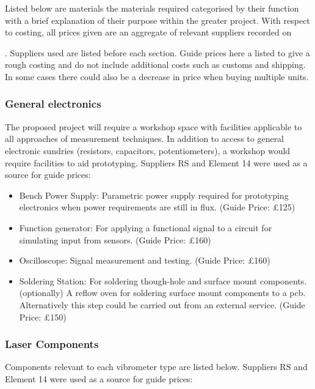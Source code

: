 Listed below are materials the materials required categorised by their function
with a brief explanation of their purpose within the greater project. With
respect to costing, all prices given are an aggregate of relevant
suppliers recorded on \date{\today}. Suppliers used are listed before each
section. Guide prices here a listed to give a rough costing and do not include
additional costs such as customs and shipping. In some cases there could also be
a decrease in price when buying multiple units.

\hypertarget{general-electronics}{%
\subsubsection{General electronics}\label{general-electronics}}

The proposed project will require a workshop space with facilities applicable to
all approaches of measurement techniques. In addition to access to general
electronic sundries (resistors, capacitors, potentiometers), a workshop would
require facilities to aid prototyping. Suppliers RS and Element 14 were used as
a source for guide prices:

\begin{itemize}

\item
  Bench Power Supply: Parametric power supply required for prototyping
  electronics when power requirements are still in flux. (Guide Price: £125)
\item
  Function generator: For applying a functional signal to a circuit for
  simulating input from sensors. (Guide Price: £160)
\item
  Oscilloscope: Signal measurement and testing. (Guide Price: £160)
\item
  Soldering Station: For soldering though-hole and surface mount components.
  (optionally) A reflow oven for soldering surface mount components to a pcb.
  Alternatively this step could be carried out from an external service. (Guide
  Price: £150)
\end{itemize}

\hypertarget{laser-components}{%
\subsubsection{Laser Components}\label{laser-components}}

Components relevant to each vibrometer type are listed below. Suppliers RS and
Element 14 were used as a source for guide prices:


